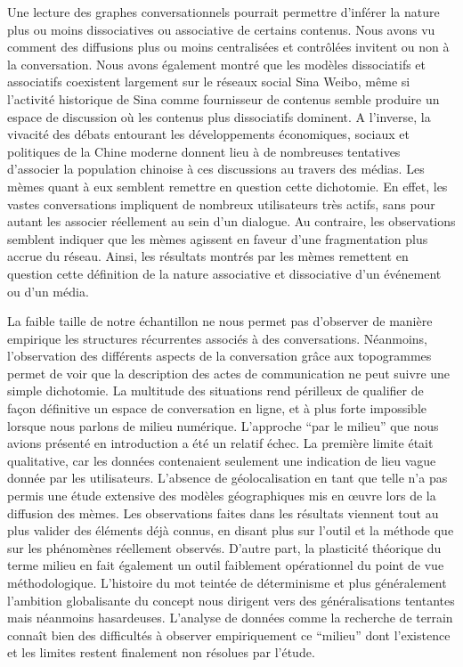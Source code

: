 Une lecture des graphes conversationnels pourrait permettre d'inférer la nature plus ou moins dissociatives ou associative de certains contenus. Nous avons vu comment des diffusions plus ou moins centralisées et contrôlées invitent ou non à la conversation. Nous avons également montré que les modèles dissociatifs et associatifs coexistent largement sur le réseaux social Sina Weibo, même si l'activité historique de Sina comme fournisseur de contenus semble produire un espace de discussion où les contenus plus dissociatifs dominent. A l{\textquoteright}inverse, la vivacité des débats entourant les développements économiques, sociaux et politiques de la Chine moderne donnent lieu à de nombreuses tentatives d{\textquoteright}associer la population chinoise à ces discussions au travers des médias. Les mèmes quant à eux semblent remettre en question cette dichotomie. En effet, les vastes conversations impliquent de nombreux utilisateurs très actifs, sans pour autant les associer réellement au sein d'un dialogue. Au contraire, les observations semblent indiquer que les mèmes agissent en faveur d'une fragmentation plus accrue du réseau. Ainsi, les résultats montrés par les mèmes remettent en question cette définition de la nature associative et dissociative d'un événement ou d'un média.

La faible taille de notre échantillon ne nous permet pas d{\textquoteright}observer de manière empirique les structures récurrentes associés à des conversations. Néanmoins, l'observation des différents aspects de la conversation grâce aux topogrammes permet de voir que la description des actes de communication ne peut suivre une simple dichotomie. La multitude des situations rend périlleux de qualifier de fa\c{c}on définitive un espace de conversation en ligne, et à plus forte impossible lorsque nous parlons de milieu numérique. L'approche ``par le milieu'' que nous avions présenté en introduction a été un relatif échec. La première limite était qualitative, car les données contenaient seulement une indication de lieu vague donnée par les utilisateurs. L'absence de géolocalisation en tant que telle n'a pas permis une étude extensive des modèles géographiques mis en œuvre lors de la diffusion des mèmes. Les observations faites dans les résultats viennent tout au plus valider des éléments déjà connus, en disant plus sur l'outil et la méthode que sur les phénomènes réellement observés. D'autre part, la plasticité théorique du terme milieu en fait également un outil faiblement opérationnel du point de vue méthodologique. L'histoire du mot teintée de déterminisme et plus généralement l'ambition globalisante du concept nous dirigent vers des généralisations tentantes mais néanmoins hasardeuses. L'analyse de données comme la recherche de terrain connaît bien des difficultés à observer empiriquement ce ``milieu'' dont l'existence et les limites restent finalement non résolues par l'étude. 


